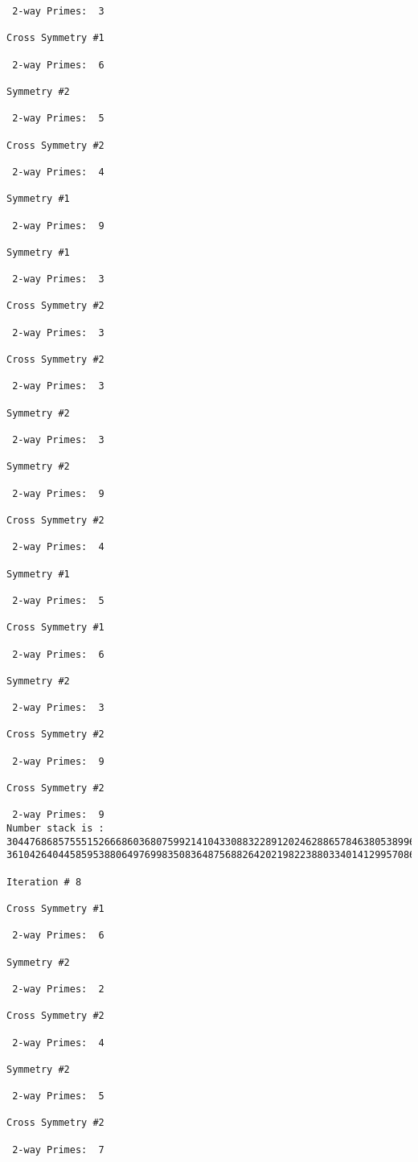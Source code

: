 {{{{\begin{verbatim}
 2-way Primes: 	3

Cross Symmetry #1

 2-way Primes: 	6

Symmetry #2

 2-way Primes: 	5

Cross Symmetry #2

 2-way Primes: 	4

Symmetry #1

 2-way Primes: 	9

Symmetry #1

 2-way Primes: 	3

Cross Symmetry #2

 2-way Primes: 	3

Cross Symmetry #2

 2-way Primes: 	3

Symmetry #2

 2-way Primes: 	3

Symmetry #2

 2-way Primes: 	9

Cross Symmetry #2

 2-way Primes: 	4

Symmetry #1

 2-way Primes: 	5

Cross Symmetry #1

 2-way Primes: 	6

Symmetry #2

 2-way Primes: 	3

Cross Symmetry #2

 2-way Primes: 	9

Cross Symmetry #2

 2-way Primes: 	9
Number stack is :
30447686857555152666860368075992141043308832289120246288657846380538996794608835958544046240163340857
36104264044585953880649769983508364875688264202198223880334014129957086306866625155575868674403758043

Iteration #	8

Cross Symmetry #1

 2-way Primes: 	6

Symmetry #2

 2-way Primes: 	2

Cross Symmetry #2

 2-way Primes: 	4

Symmetry #2

 2-way Primes: 	5

Cross Symmetry #2

 2-way Primes: 	7


\end{verbatim}}}}}

